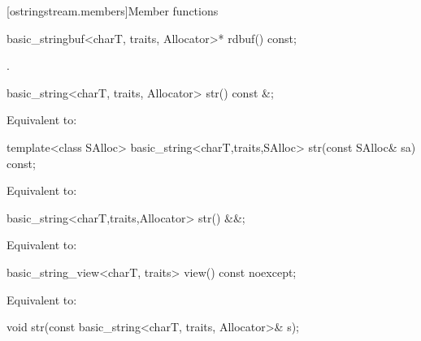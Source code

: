 [ostringstream.members]{Member functions}

%
\begin{itemdecl}
basic_stringbuf<charT, traits, Allocator>* rdbuf() const;
\end{itemdecl}

\begin{itemdescr}
\pnum
\returns
{}.
\end{itemdescr}

%
\begin{itemdecl}
basic_string<charT, traits, Allocator> str() const &;
\end{itemdecl}

\begin{itemdescr}
\pnum
\effects
Equivalent to: 
\end{itemdescr}

%
\begin{itemdecl}
template<class SAlloc>
  basic_string<charT,traits,SAlloc> str(const SAlloc& sa) const;
\end{itemdecl}

\begin{itemdescr}
\pnum
\effects
Equivalent to: 
\end{itemdescr}

%
\begin{itemdecl}
basic_string<charT,traits,Allocator> str() &&;
\end{itemdecl}

\begin{itemdescr}
\pnum
\effects
Equivalent to: 
\end{itemdescr}

%
\begin{itemdecl}
basic_string_view<charT, traits> view() const noexcept;
\end{itemdecl}

\begin{itemdescr}
\pnum
\effects
Equivalent to: 
\end{itemdescr}

%
\begin{itemdecl}
void str(const basic_string<charT, traits, Allocator>& s);
\end{itemdecl}

